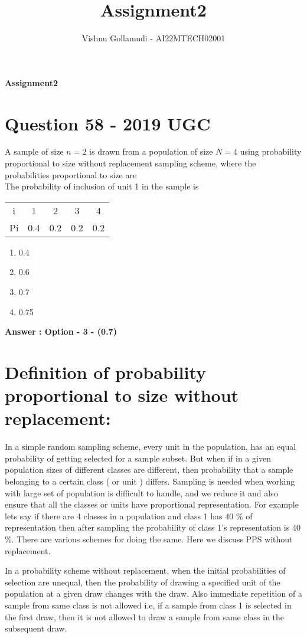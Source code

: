 \documentclass{article}
\title{Assignment2}
\author{Vishnu Gollamudi - AI22MTECH02001}
\begin{document}
\huge \textbf{Assignment2}
\section{Question 58 - 2019 UGC}
A sample of size $n = 2$ is drawn from a population of size $N = 4$ using probability proportional to size
without replacement sampling scheme, where the probabilities proportional to size are\\
The probability of inclusion of unit 1 in the sample is
\begin{center}
\begin{tabular}{ c c c c c}
 i  & 1   & 2   & 3   & 4   \\ 
 Pi & 0.4 & 0.2 & 0.2 & 0.2 \\  
\end{tabular}
\end{center}
\begin{enumerate}
    \item 0.4 
    \item 0.6
    \item 0.7
    \item 0.75
\end{enumerate}
\large \textbf{Answer : Option - 3 - (0.7)}\\
\section{Definition of probability proportional to size without replacement:}
In a simple random sampling scheme, every unit in the population, has an equal probability of getting selected for a sample subset. But when if in a given population sizes of different classes are different, then probability that a sample belonging to a certain class ( or unit ) differs. Sampling is needed when working with large set of population is difficult to handle, and we reduce it and also ensure that all the classes or units have proportional representation. For example lets say if there are 4 classes in a population and class 1 has 40 $\%$ of representation then after sampling the probability of class 1's representation is 40$\%$. There are various schemes for doing the same. Here we discuss PPS without replacement.\par
In a probability scheme without replacement, when the initial probabilities of selection are unequal, then the probability of drawing a specified unit of the population at a given draw changes with the draw. Also immediate repetition of a sample from same class is not allowed i.e, if a sample from class 1 is selected in the first draw, then it is not allowed to draw a sample from same class in the subsequent draw. \par
\end{document}
